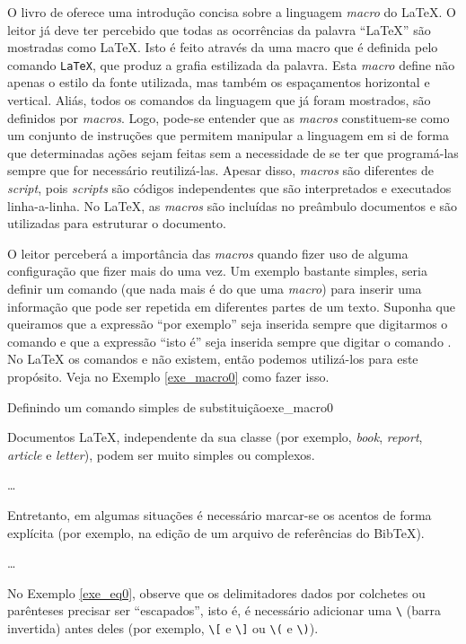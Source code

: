 O livro de  oferece uma introdução concisa sobre a linguagem \textit{macro} do \LaTeX{}. O leitor já deve ter percebido que todas as ocorrências da palavra ``LaTeX'' são mostradas como \LaTeX{}. Isto é feito através da uma macro que é definida pelo comando \texttt{\LaTeX{}}, que produz a grafia estilizada da palavra. Esta \textit{macro} define não apenas o estilo da fonte utilizada, mas também os espaçamentos horizontal e vertical. Aliás, todos os comandos da linguagem que já foram mostrados, são definidos por \textit{macros}. Logo, pode-se entender que as \textit{macros} constituem-se como um conjunto de instruções que permitem manipular a linguagem em si de forma que determinadas ações sejam feitas sem a necessidade de se ter que programá-las sempre que for necessário reutilizá-las. Apesar disso, \textit{macros} são diferentes de \textit{script}, pois \textit{scripts} são códigos independentes que são interpretados e executados linha-a-linha. No \LaTeX{}, as \textit{macros} são incluídas no preâmbulo documentos e são utilizadas para estruturar o documento.

O leitor perceberá a importância das \textit{macros} quando fizer uso de alguma configuração que fizer mais do uma vez. Um exemplo bastante simples, seria definir um comando (que nada mais é do que uma \textit{macro}) para inserir uma informação que pode ser repetida em diferentes partes de um texto. Suponha que queiramos que a expressão ``por exemplo'' seja inserida sempre que digitarmos o comando \texttt{\eg} e que a expressão ``isto é'' seja inserida sempre que digitar o comando \texttt{\ie}. No \LaTeX{} os comandos \texttt{\eg} e \texttt{\ie} não existem, então podemos utilizá-los para este propósito. Veja no Exemplo \ref{exe_macro0} como fazer isso.

\begin{texexptitled}[breakable,center lower,enhanced,middle=2mm]{Definindo um comando simples de substituição}{exe_macro0}
\newcommand{\eg}{por exemplo}
\newcommand{\ie}{isto é}

Documentos \LaTeX{}, independente da sua classe (\eg, \textit{book}, 
\textit{report}, \textit{article} e \textit{letter}), podem ser muito 
simples ou complexos.

\dots

Entretanto, em algumas situações é necessário marcar-se os acentos 
de forma explícita (\eg, na edição de um arquivo de referências 
do BibTeX).

\dots

No Exemplo \ref{exe_eq0}, observe que os delimitadores dados por 
colchetes ou parênteses precisar ser ``escapados'', \ie, é necessário 
adicionar uma \verb|\| (barra invertida) antes deles (\eg, \verb|\[|
e \verb|\]| ou \verb|\(| e \verb|\)|).
\end{texexptitled}

